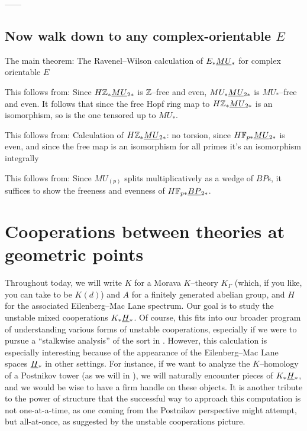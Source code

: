 
------

\subsection*{Now walk down to any complex-orientable $E$}

The main theorem: The Ravenel--Wilson calculation of $E_* \smash{\underline{MU}}_{*}$ for complex orientable $E$

This follows from: Since $H\mathbb Z_* \smash{\underline{MU}}_{2*}$ is $\mathbb Z$--free and even, $MU_* \smash{\underline{MU}}_{2*}$ is $MU_*$--free and even.  It follows that since the free Hopf ring map to $H\mathbb Z_* \smash{\underline{MU}}_{2*}$ is an isomorphism, so is the one tensored up to $MU_*$.

This follows from: Calculation of $H\mathbb Z_* \smash{\underline{MU}}_{2*}$: no torsion, since $H\mathbb F_{p*} \smash{\underline{MU}}_{2*}$ is even, and since the free map is an isomorphism for all primes it's an isomorphism integrally

This follows from: Since $MU_{(p)}$ splits multiplicatively as a wedge of $BP$s, it suffices to show the freeness and evenness of $H\mathbb F_{p*} \smash{\underline{BP}}_{2*}$.














\section{Cooperations between theories at geometric points}


Throughout today, we will write $K$ for a Morava $K$--theory $K_\Gamma$ (which, if you like, you can take to be $K(d)$) and $A$ for a finitely generated abelian group, and $H$ for the associated Eilenberg--Mac Lane spectrum.  Our goal is to study the unstable mixed cooperations $K_* \smash{\underline{H}}_{*}$.  Of course, this fits into our broader program of understanding various forms of unstable cooperations, especially if we were to pursue a ``stalkwise analysis'' of the sort in .  However, this calculation is especially interesting because of the appearance of the Eilenberg--Mac Lane spaces $\smash{\underline{H}}_{*}$ in other settings.  For instance, if we want to analyze the $K$--homology of a Postnikov tower (as we will in ), we will naturally encounter pieces of $K_* \smash{\underline{H}}_{*}$, and we would be wise to have a firm handle on these objects.  It is another tribute to the power of structure that the successful way to approach this computation is not one-at-a-time, as one coming from the Postnikov perspective might attempt, but all-at-once, as suggested by the unstable cooperations picture.


